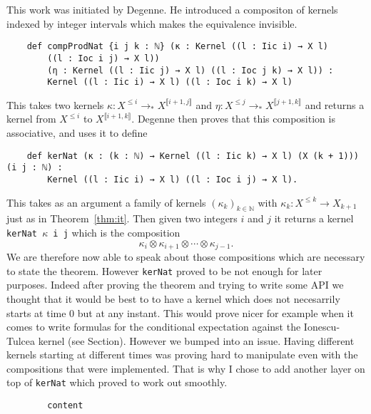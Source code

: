 \documentclass{article}
\newcommand{\N}{\mathbb{N}}
\newcommand{\Xle}[1]{X^{\le#1}}
\newcommand{\dbrack}[1]{\llbracket #1 \rrbracket}
\newcommand{\ox}{\otimes}
\newcommand{\tost}{\to_*}
\theoremstyle{definition}
\theoremstyle{remark}
\begin{document}
	This work was initiated by Degenne. He introduced a compositon of kernels indexed by integer intervals which makes the equivalence invisible.
	\begin{lstlisting}
	def compProdNat {i j k : ℕ} (κ : Kernel ((l : Iic i) → X l)
		((l : Ioc i j) → X l))
		(η : Kernel ((l : Iic j) → X l) ((l : Ioc j k) → X l)) :
		Kernel ((l : Iic i) → X l) ((l : Ioc i k) → X l)
	\end{lstlisting}
	This takes two kernels $\kappa : \Xle{i} \tost X^{\dbrack{i+1,j}}$ and $\eta : \Xle{j} \tost X^{\dbrack{j+1,k}}$ and returns a kernel from $\Xle{i}$ to $X^{\dbrack{i+1,k}}$. Degenne then proves that this composition is associative, and uses it to define
	\begin{lstlisting}
	def kerNat (κ : (k : ℕ) → Kernel ((l : Iic k) → X l) (X (k + 1))) (i j : ℕ) :
		Kernel ((l : Iic i) → X l) ((l : Ioc i j) → X l).
	\end{lstlisting}
	This takes as an argument a family of kernels $(\kappa_k)_{k\in\N}$ with $\kappa_k : \Xle{k}\to X_{k+1}$ just as in Theorem~\ref{thm:it}. Then given two integers $i$ and $j$ it returns a kernel \texttt{kerNat $\kappa$ i j} which is the composition
	$$\kappa_i \ox \kappa_{i+1} \ox \cdots \ox \kappa_{j-1}.$$
	We are therefore now able to speak about those compositions which are necessary to state the theorem. However \texttt{kerNat} proved to be not enough for later purposes. Indeed after proving the theorem and trying to write some API we thought that it would be best to to have a kernel which does not necesarrily starts at time 0 but at any instant. This  would prove nicer for example when it comes to write formulas for the conditional expectation against the Ionescu-Tulcea kernel (see Section). However we bumped into an issue. Having different kernels starting at different times was proving hard to manipulate even with the compositions that were implemented. That is why I chose to add another layer on top of \texttt{kerNat} which proved to work out smoothly.
	\begin{lstlisting}
		content
	\end{lstlisting}
\end{document}
